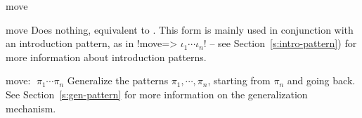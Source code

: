 \begin{tactic}{move}
  \begin{tsyntax}{move}
     Does nothing, equivalent to . This form is mainly
     used in conjunction with an introduction pattern, as in
     \ls!move=> $\iota_1 \cdots \iota_n$! -- see Section~\ref{s:intro-pattern})
     for more information about introduction patterns.
  \end{tsyntax}

  \begin{tsyntax}{move: $\;\pi_1 \cdots \pi_n$}
    Generalize the patterns $\pi_1, \cdots, \pi_n$, starting from
    $\pi_n$ and going back. See Section~\ref{s:gen-pattern} for more
    information on the generalization mechanism.
  \end{tsyntax}
\end{tactic}
